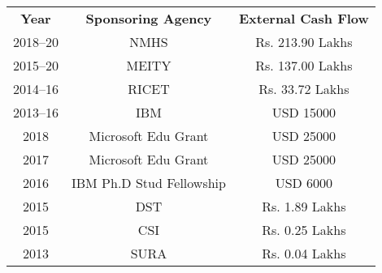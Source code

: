 	
	\begin{center}{\small
		\begin{tabular}{|c|c|c|}
			\textbf{Year} & \textbf{Sponsoring Agency} & \textbf{External Cash Flow} \\
			2018--20 & NMHS & Rs. 213.90 Lakhs \\  %
			2015--20 & MEITY & Rs. 137.00 Lakhs  \\ %
			2014--16 & RICET & Rs. 33.72 Lakhs  \\ %
			2013--16 & IBM & USD 15000 \\ %
			2018 & Microsoft Edu Grant & USD 25000 \\ %
			2017 & Microsoft Edu Grant & USD 25000 \\ %
			2016 & IBM Ph.D Stud Fellowship & USD 6000 \\ %
			2015 & DST & Rs. 1.89 Lakhs \\ %
			2015 & CSI & Rs. 0.25 Lakhs \\ %
			2013 & SURA & Rs. 0.04 Lakhs %
			
	\end{tabular}}
\end{center}